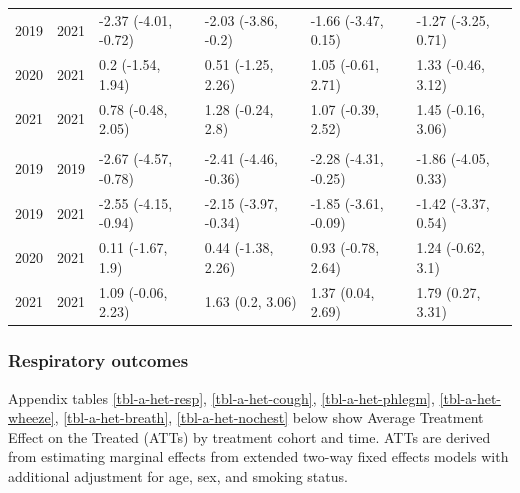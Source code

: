 \documentclass[
  letterpaper,
  DIV=11,
  numbers=noendperiod]{scrartcl}
\makeatletter
\renewenvironment{table}%
  {\renewcommand\familydefault\sfdefault
   \@float{table}}
  {\end@float}
\makeatother
\begin{document}
\begin{table}
\begin{tabular}{rrllll}
\hspace{1em}2019 & 2021 & -2.37 (-4.01, -0.72) & -2.03 (-3.86, -0.2) & -1.66 (-3.47, 0.15) & -1.27 (-3.25, 0.71)\\
\hspace{1em}2020 & 2021 & 0.2 (-1.54, 1.94) & 0.51 (-1.25, 2.26) & 1.05 (-0.61, 2.71) & 1.33 (-0.46, 3.12)\\
\hspace{1em}2021 & 2021 & 0.78 (-0.48, 2.05) & 1.28 (-0.24, 2.8) & 1.07 (-0.39, 2.52) & 1.45 (-0.16, 3.06)\\
\addlinespace[0.3em]
\multicolumn{6}{l}{\textbf{Central DBP}}\\
\hspace{1em}2019 & 2019 & -2.67 (-4.57, -0.78) & -2.41 (-4.46, -0.36) & -2.28 (-4.31, -0.25) & -1.86 (-4.05, 0.33)\\
\hspace{1em}2019 & 2021 & -2.55 (-4.15, -0.94) & -2.15 (-3.97, -0.34) & -1.85 (-3.61, -0.09) & -1.42 (-3.37, 0.54)\\
\hspace{1em}2020 & 2021 & 0.11 (-1.67, 1.9) & 0.44 (-1.38, 2.26) & 0.93 (-0.78, 2.64) & 1.24 (-0.62, 3.1)\\
\hspace{1em}2021 & 2021 & 1.09 (-0.06, 2.23) & 1.63 (0.2, 3.06) & 1.37 (0.04, 2.69) & 1.79 (0.27, 3.31)\\
\bottomrule
\end{tabular}
\end{table}

\hypertarget{respiratory-outcomes}{%
\subsubsection{Respiratory outcomes}\label{respiratory-outcomes}}

Appendix tables \ref{tbl-a-het-resp}, \ref{tbl-a-het-cough},
\ref{tbl-a-het-phlegm}, \ref{tbl-a-het-wheeze}, \ref{tbl-a-het-breath},
\ref{tbl-a-het-nochest} below show Average Treatment Effect on the
Treated (ATTs) by treatment cohort and time. ATTs are derived from
estimating marginal effects from extended two-way fixed effects models
with additional adjustment for age, sex, and smoking status.
\end{document}
